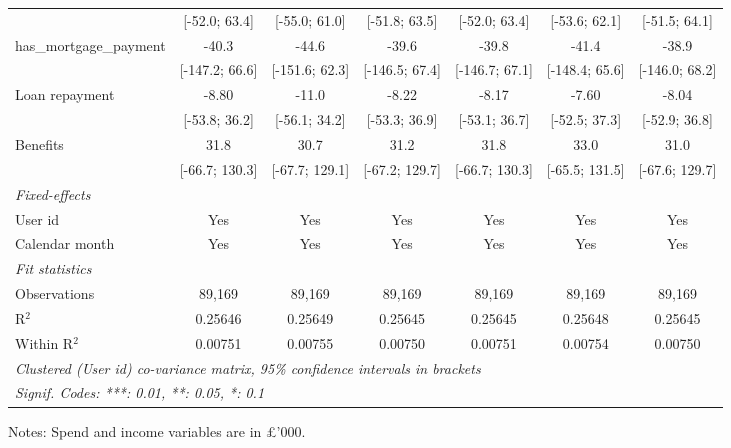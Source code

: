 \begin{table}[htbp]
\begin{threeparttable}[b]
\begin{tabular}{lcccccc}
                                   & [-52.0; 63.4]   & [-55.0; 61.0]   & [-51.8; 63.5]   & [-52.0; 63.4]   & [-53.6; 62.1]   & [-51.5; 64.1]\\   
         has\_mortgage\_payment    & -40.3           & -44.6           & -39.6           & -39.8           & -41.4           & -38.9\\   
                                   & [-147.2; 66.6]  & [-151.6; 62.3]  & [-146.5; 67.4]  & [-146.7; 67.1]  & [-148.4; 65.6]  & [-146.0; 68.2]\\   
         Loan repayment            & -8.80           & -11.0           & -8.22           & -8.17           & -7.60           & -8.04\\   
                                   & [-53.8; 36.2]   & [-56.1; 34.2]   & [-53.3; 36.9]   & [-53.1; 36.7]   & [-52.5; 37.3]   & [-52.9; 36.8]\\   
         Benefits                  & 31.8            & 30.7            & 31.2            & 31.8            & 33.0            & 31.0\\   
                                   & [-66.7; 130.3]  & [-67.7; 129.1]  & [-67.2; 129.7]  & [-66.7; 130.3]  & [-65.5; 131.5]  & [-67.6; 129.7]\\   
         \midrule
         \emph{Fixed-effects}\\
         User id                   & Yes             & Yes             & Yes             & Yes             & Yes             & Yes\\  
         Calendar month            & Yes             & Yes             & Yes             & Yes             & Yes             & Yes\\  
         \midrule
         \emph{Fit statistics}\\
         Observations              & 89,169          & 89,169          & 89,169          & 89,169          & 89,169          & 89,169\\  
         R$^2$                     & 0.25646         & 0.25649         & 0.25645         & 0.25645         & 0.25648         & 0.25645\\  
         Within R$^2$              & 0.00751         & 0.00755         & 0.00750         & 0.00751         & 0.00754         & 0.00750\\  
         \midrule \midrule
         \multicolumn{7}{l}{\emph{Clustered (User id) co-variance matrix, 95\% confidence intervals in brackets}}\\
         \multicolumn{7}{l}{\emph{Signif. Codes: ***: 0.01, **: 0.05, *: 0.1}}\\
      \end{tabular}
      
      \begin{tablenotes}\footnotesize
         \item Notes: Spend and income variables are in \pounds'000.
      \end{tablenotes}
   \end{threeparttable}
\end{table}



